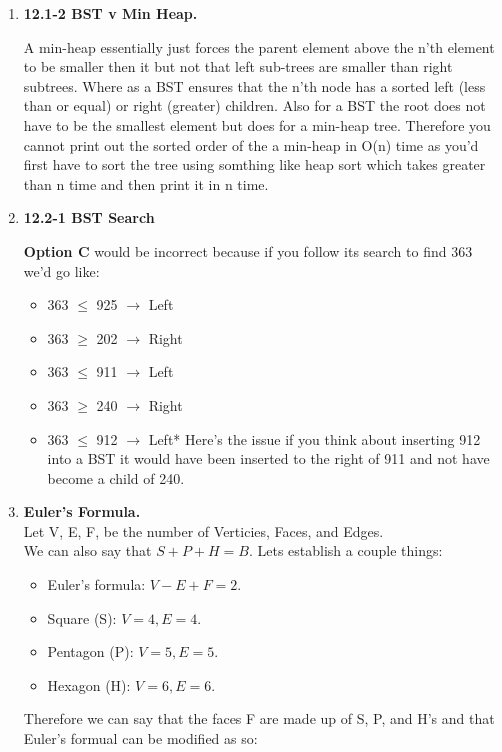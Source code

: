 \documentclass{article}
\begin{document}
\begin{enumerate}
    \item \textbf{12.1-2 BST v Min Heap.} 
    
    A min-heap essentially just forces the parent element above the n'th element to be smaller then it but not that left sub-trees are smaller than right subtrees. Where as a BST ensures that the n'th node has a sorted left (less than or equal) or right (greater) children. 
    Also for a BST the root does not have to be the smallest element but does for a min-heap tree. Therefore you cannot print out the sorted order of the a min-heap in O(n) time as you'd first have to sort the tree using somthing like heap sort which takes greater than n time and then print it in n time.

    \item \textbf{12.2-1 BST Search}
    
    \textbf{Option C} would be incorrect because if you follow its search to find 363 we'd go like:
    \begin{itemize}
      \item 363 $\leq$ 925 $\rightarrow$ Left
      \item 363 $\geq$ 202 $\rightarrow$ Right
      \item 363 $\leq$ 911 $\rightarrow$ Left
      \item 363 $\geq$ 240 $\rightarrow$ Right
      \item 363 $\leq$ 912 $\rightarrow$ Left* Here's the issue if you think about inserting 912 into a BST it would have been inserted to the right of 911 and not have become a child of 240. 
    \end{itemize}

    \item \textbf{Euler's Formula.} \\
    
    Let V, E, F, be the number of Verticies, Faces, and Edges. \\
    We can also say that $S + P + H = B$.
    Lets establish a couple things: 
    \begin{itemize}
        \item Euler's formula: $V - E + F = 2$.
        \item Square (S): $V = 4, E = 4$.
        \item Pentagon (P): $V = 5, E = 5$.
        \item Hexagon (H): $V = 6, E = 6$.
    \end{itemize}

    Therefore we can say that the faces F are made up of S, P, and H's and that Euler's formual can be modified as so:


\end{enumerate}
\end{document}
